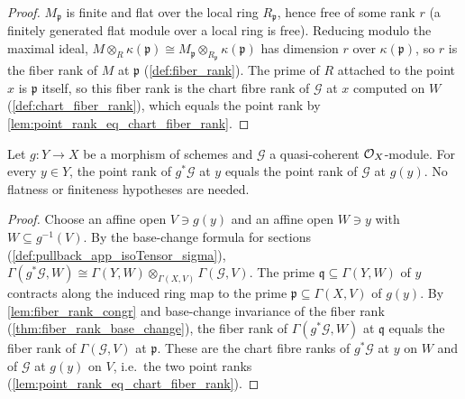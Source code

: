 \begin{proof}
  \leanok
  \(M_{\mathfrak p}\) is finite and flat over the local ring
  \(R_{\mathfrak p}\), hence free of some rank \(r\) (a finitely generated
  flat module over a local ring is free).  Reducing modulo the maximal
  ideal,
  \(M \otimes_R \kappa(\mathfrak p)
    \cong M_{\mathfrak p} \otimes_{R_{\mathfrak p}} \kappa(\mathfrak p)\)
  has dimension \(r\) over \(\kappa(\mathfrak p)\), so \(r\) is the fiber
  rank of \(M\) at \(\mathfrak p\) (\cref{def:fiber_rank}).  The prime of
  \(R\) attached to the point \(x\) is \(\mathfrak p\) itself, so this fiber
  rank is the chart fibre rank of \(\mathcal G\) at \(x\) computed on \(W\)
  (\cref{def:chart_fiber_rank}), which equals the point rank by
  \cref{lem:point_rank_eq_chart_fiber_rank}.
\end{proof}

\begin{theorem}
  \label{thm:point_rank_pullback}
  \leanok
  Let \(g : Y \to X\) be a morphism of schemes and \(\mathcal G\) a
  quasi-coherent \(\mathcal{O}_X\)-module.  For every \(y \in Y\), the point rank of
  \(g^*\mathcal G\) at \(y\) equals the point rank of \(\mathcal G\) at
  \(g(y)\).  No flatness or finiteness hypotheses are needed.
\end{theorem}

\begin{proof}
  \leanok
  Choose an affine open \(V \ni g(y)\) and an affine open \(W \ni y\) with
  \(W \subseteq g^{-1}(V)\).  By the base-change formula for sections
  (\cref{def:pullback_app_isoTensor_sigma}),
  \(\Gamma(g^*\mathcal G, W) \cong
    \Gamma(Y, W) \otimes_{\Gamma(X, V)} \Gamma(\mathcal G, V)\).  The prime
  \(\mathfrak q \subseteq \Gamma(Y, W)\) of \(y\) contracts along the
  induced ring map to the prime \(\mathfrak p \subseteq \Gamma(X, V)\) of
  \(g(y)\).  By \cref{lem:fiber_rank_congr} and base-change invariance of
  the fiber rank (\cref{thm:fiber_rank_base_change}), the fiber rank of
  \(\Gamma(g^*\mathcal G, W)\) at \(\mathfrak q\) equals the fiber rank of
  \(\Gamma(\mathcal G, V)\) at \(\mathfrak p\).  These are the chart fibre
  ranks of \(g^*\mathcal G\) at \(y\) on \(W\) and of \(\mathcal G\) at
  \(g(y)\) on \(V\), i.e.\ the two point ranks
  (\cref{lem:point_rank_eq_chart_fiber_rank}).
\end{proof}

